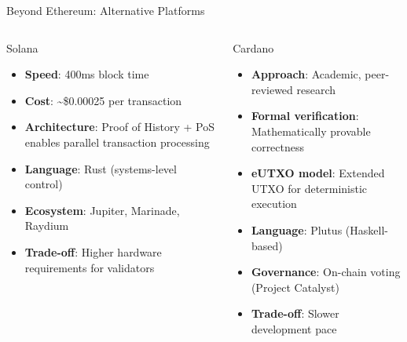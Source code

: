 \documentclass[8pt,aspectratio=169]{beamer}
\begin{document}
\begin{frame}{Beyond Ethereum: Alternative Platforms}
\begin{columns}[T]
\begin{block}{\textcolor{mlblue}{Solana}}
\footnotesize
\begin{itemize}
  \item \textbf{Speed}: 400ms block time
  \item \textbf{Cost}: \textasciitilde\$0.00025 per transaction
  \item \textbf{Architecture}: Proof of History + PoS enables parallel transaction processing
  \item \textbf{Language}: Rust (systems-level control)
  \item \textbf{Ecosystem}: Jupiter, Marinade, Raydium
  \item \textbf{Trade-off}: Higher hardware requirements for validators
\end{itemize}
\end{block}

\begin{block}{\textcolor{mlgreen}{Cardano}}
\footnotesize
\begin{itemize}
  \item \textbf{Approach}: Academic, peer-reviewed research
  \item \textbf{Formal verification}: Mathematically provable correctness
  \item \textbf{eUTXO model}: Extended UTXO for deterministic execution
  \item \textbf{Language}: Plutus (Haskell-based)
  \item \textbf{Governance}: On-chain voting (Project Catalyst)
  \item \textbf{Trade-off}: Slower development pace
\end{itemize}
\end{block}


\end{columns}
\end{frame}
\end{document}
